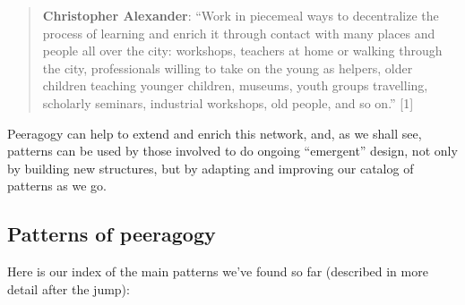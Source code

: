 \begin{quote}
\textbf{Christopher Alexander}: ``Work in piecemeal ways to decentralize
the process of learning and enrich it through contact with many places
and people all over the city: workshops, teachers at home or walking
through the city, professionals willing to take on the young as helpers,
older children teaching younger children, museums, youth groups
travelling, scholarly seminars, industrial workshops, old people, and so
on.'' {[}1{]}

\end{quote}
Peeragogy can help to extend and enrich this network, and, as we shall
see, patterns can be used by those involved to do ongoing ``emergent''
design, not only by building new structures, but by adapting and
improving our catalog of patterns as we go.

\subsection{Patterns of peeragogy}

Here is our index of the main patterns we've found so far (described in
more detail after the jump):

